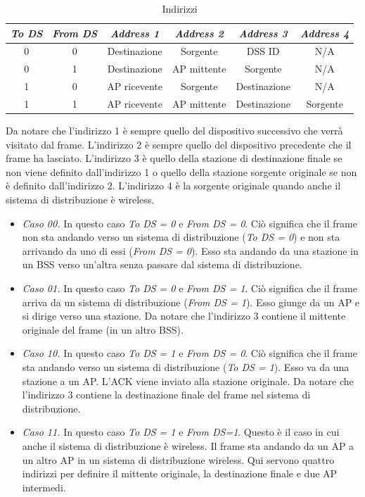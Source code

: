 \begin{table}[ht]
    \centering
    \begin{tabular}{|c|c|c|c|c|c|}
         \hline
         \textit{To DS} & \textit{From DS} & \textit{Address 1} & \textit{Address 2} & \textit{Address 3} & \textit{Address 4}\\\hline
         0&0 & Destinazione & Sorgente & DSS ID & N/A\\\hline
         0&1 & Destinazione & AP mittente & Sorgente & N/A\\\hline
         1&0 & AP ricevente & Sorgente & Destinazione & N/A\\\hline
         1&1 & AP ricevente & AP mittente & Destinazione & Sorgente\\\hline
    \end{tabular}
    \caption{Indirizzi}
    \label{tab:indirizzi}
\end{table}

Da notare che l'indirizzo 1 è sempre quello del dispositivo successivo che verrà visitato dal frame. L'indirizzo 2 è sempre quello del dispositivo precedente che il frame ha lasciato. L'indirizzo 3 è quello della stazione di destinazione finale se non viene definito dall'indirizzo 1 o quello della stazione sorgente originale se non è definito dall'indirizzo 2. L'indirizzo 4 è la sorgente originale quando anche il sistema di distribuzione è wireless.
\begin{itemize}
    \item \textit{Caso 00.} In questo caso \textit{To DS = 0} e \textit{From DS = 0}. Ciò significa che il frame non sta andando verso un sistema di distribuzione (\textit{To DS = 0}) e non sta arrivando da uno di essi (\textit{From DS = 0}). Esso sta andando da una stazione in un BSS verso un'altra senza passare dal sistema di distribuzione.
    \item \textit{Caso 01.} In questo caso \textit{To DS = 0} e \textit{From DS = 1}. Ciò significa che il frame arriva da un sistema di distribuzione (\textit{From DS = 1}). Esso giunge da un AP e si dirige verso una stazione. Da notare che l'indirizzo 3 contiene il mittente originale del frame (in un altro BSS).
    \item \textit{Caso 10.} In questo caso \textit{To DS = 1} e \textit{From DS = 0}. Ciò significa che il frame sta andando verso un sistema di distribuzione (\textit{To DS = 1}). Esso va da una stazione a un AP. L'ACK viene inviato alla stazione originale. Da notare che l'indirizzo 3 contiene la destinazione finale del frame nel sistema di distribuzione.
    \item \textit{Caso 11.} In questo caso \textit{To DS = 1} e \textit{From DS=1}. Questo è il caso in cui anche il sistema di distribuzione è wireless. Il frame sta andando da un AP a un altro AP in un sistema di distribuzione wireless. Qui servono quattro indirizzi per definire il mittente originale, la destinazione finale e due AP intermedi.
\end{itemize}

